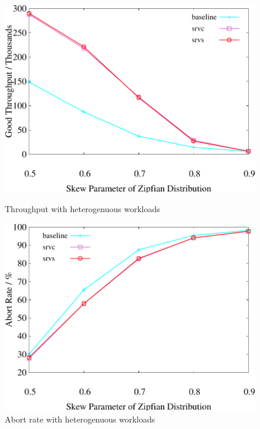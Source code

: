 \begin{figure}[t]
    \centering
    \begin{minipage}[b]{0.32\linewidth}
        \centering
        \includegraphics[width=\textwidth]{./exp_fig/weighted_size/tps}
        \vspace{-2em}
        \caption{Throughput with heterogenuous workloads}
        \label{fig:weighted:tps}
    \end{minipage}
    \begin{minipage}[b]{0.32\linewidth}
        \centering
        \includegraphics[width=\textwidth]{./exp_fig/weighted_size/abort}
        \vspace{-2em}
        \caption{Abort rate with heterogenuous workloads}

\end{minipage}
\end{figure}
